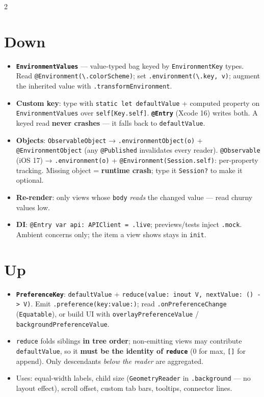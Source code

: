 \documentclass[8pt]{extarticle}
\begin{document}
\begin{multicols}{2}
\raggedright

\section{Down}
\begin{itemize}
  \item \textbf{\texttt{EnvironmentValues}} — value-typed bag keyed by \texttt{EnvironmentKey} types. Read
        \texttt{@Environment(\textbackslash.colorScheme)}; set \texttt{.environment(\textbackslash.key, v)};
        augment the inherited value with \texttt{.transformEnvironment}.
  \item \textbf{Custom key}: type with \texttt{static let defaultValue} + computed property on
        \texttt{EnvironmentValues} over \texttt{self[Key.self]}. \textbf{\texttt{@Entry}} (Xcode 16) writes both.
        A keyed read \textbf{never crashes} — it falls back to \texttt{defaultValue}.
  \item \textbf{Objects}: \texttt{ObservableObject} → \texttt{.environmentObject(o)} + \texttt{@EnvironmentObject}
        (any \texttt{@Published} invalidates every reader). \texttt{@Observable} (iOS 17) →
        \texttt{.environment(o)} + \texttt{@Environment(Session.self)}: per-property tracking.
        Missing object = \textbf{runtime crash}; type it \texttt{Session?} to make it optional.
  \item \textbf{Re-render}: only views whose \texttt{body} \emph{reads} the changed value — read churny values low.
  \item \textbf{DI}: \texttt{@Entry var api: APIClient = .live}; previews/tests inject \texttt{.mock}. Ambient
        concerns only; the item a view shows stays in \texttt{init}.
\end{itemize}

\section{Up}
\begin{itemize}
  \item \textbf{\texttt{PreferenceKey}}: \texttt{defaultValue} + \texttt{reduce(value: inout V, nextValue: ()\,\hbox{-}\hbox{>}\,V)}.
        Emit \texttt{.preference(key:value:)}; read \texttt{.onPreferenceChange} (\texttt{Equatable}), or build UI
        with \texttt{overlayPreferenceValue} / \texttt{backgroundPreferenceValue}.
  \item \texttt{reduce} folds siblings \textbf{in tree order}; non-emitting views may contribute
        \texttt{defaultValue}, so it \textbf{must be the identity of \texttt{reduce}} (0 for max, \texttt{[]} for append).
        Only descendants \emph{below the reader} are aggregated.
  \item Uses: equal-width labels, child size (\texttt{GeometryReader} in \texttt{.background} — no layout
        effect), scroll offset, custom tab bars, tooltips, connector lines.
\end{itemize}


\end{multicols}
\end{document}
